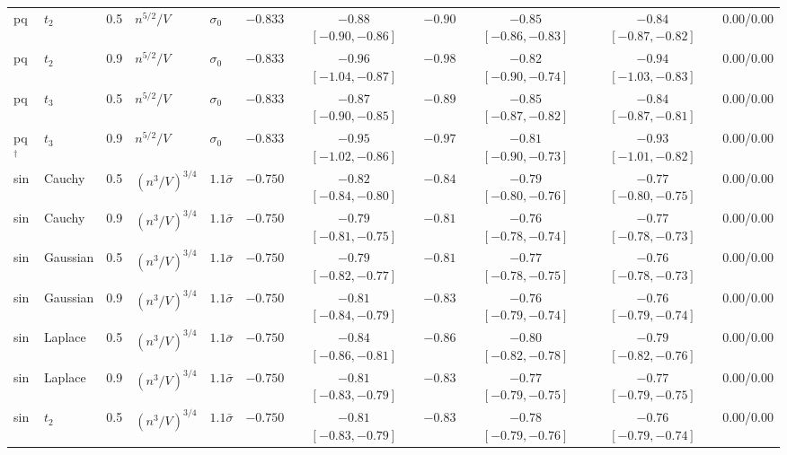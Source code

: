 \begin{longtable}{lllllcccccc}
pq & $t_2$ & 0.5 & $n^{5/2}/V$ & $\sigma_0$ & $-0.833$ & $-0.88$ {\scriptsize $[-0.90, -0.86]$} & $-0.90$ & $-0.85$ {\scriptsize $[-0.86, -0.83]$} & $-0.84$ {\scriptsize $[-0.87, -0.82]$} & 0.00/0.00 \\
pq & $t_2$ & 0.9 & $n^{5/2}/V$ & $\sigma_0$ & $-0.833$ & $-0.96$ {\scriptsize $[-1.04, -0.87]$} & $-0.98$ & $-0.82$ {\scriptsize $[-0.90, -0.74]$} & $-0.94$ {\scriptsize $[-1.03, -0.83]$} & 0.00/0.00 \\
pq & $t_3$ & 0.5 & $n^{5/2}/V$ & $\sigma_0$ & $-0.833$ & $-0.87$ {\scriptsize $[-0.90, -0.85]$} & $-0.89$ & $-0.85$ {\scriptsize $[-0.87, -0.82]$} & $-0.84$ {\scriptsize $[-0.87, -0.81]$} & 0.00/0.00 \\
pq$^\dagger$ & $t_3$ & 0.9 & $n^{5/2}/V$ & $\sigma_0$ & $-0.833$ & $-0.95$ {\scriptsize $[-1.02, -0.86]$} & $-0.97$ & $-0.81$ {\scriptsize $[-0.90, -0.73]$} & $-0.93$ {\scriptsize $[-1.01, -0.82]$} & 0.00/0.00 \\
sin & Cauchy & 0.5 & $(n^3/V)^{3/4}$ & $1.1\bar\sigma$ & $-0.750$ & $-0.82$ {\scriptsize $[-0.84, -0.80]$} & $-0.84$ & $-0.79$ {\scriptsize $[-0.80, -0.76]$} & $-0.77$ {\scriptsize $[-0.80, -0.75]$} & 0.00/0.00 \\
sin & Cauchy & 0.9 & $(n^3/V)^{3/4}$ & $1.1\bar\sigma$ & $-0.750$ & $-0.79$ {\scriptsize $[-0.81, -0.75]$} & $-0.81$ & $-0.76$ {\scriptsize $[-0.78, -0.74]$} & $-0.77$ {\scriptsize $[-0.78, -0.73]$} & 0.00/0.00 \\
sin & Gaussian & 0.5 & $(n^3/V)^{3/4}$ & $1.1\bar\sigma$ & $-0.750$ & $-0.79$ {\scriptsize $[-0.82, -0.77]$} & $-0.81$ & $-0.77$ {\scriptsize $[-0.78, -0.75]$} & $-0.76$ {\scriptsize $[-0.78, -0.73]$} & 0.00/0.00 \\
sin & Gaussian & 0.9 & $(n^3/V)^{3/4}$ & $1.1\bar\sigma$ & $-0.750$ & $-0.81$ {\scriptsize $[-0.84, -0.79]$} & $-0.83$ & $-0.76$ {\scriptsize $[-0.79, -0.74]$} & $-0.76$ {\scriptsize $[-0.79, -0.74]$} & 0.00/0.00 \\
sin & Laplace & 0.5 & $(n^3/V)^{3/4}$ & $1.1\bar\sigma$ & $-0.750$ & $-0.84$ {\scriptsize $[-0.86, -0.81]$} & $-0.86$ & $-0.80$ {\scriptsize $[-0.82, -0.78]$} & $-0.79$ {\scriptsize $[-0.82, -0.76]$} & 0.00/0.00 \\
sin & Laplace & 0.9 & $(n^3/V)^{3/4}$ & $1.1\bar\sigma$ & $-0.750$ & $-0.81$ {\scriptsize $[-0.83, -0.79]$} & $-0.83$ & $-0.77$ {\scriptsize $[-0.79, -0.75]$} & $-0.77$ {\scriptsize $[-0.79, -0.75]$} & 0.00/0.00 \\
sin & $t_2$ & 0.5 & $(n^3/V)^{3/4}$ & $1.1\bar\sigma$ & $-0.750$ & $-0.81$ {\scriptsize $[-0.83, -0.79]$} & $-0.83$ & $-0.78$ {\scriptsize $[-0.79, -0.76]$} & $-0.76$ {\scriptsize $[-0.79, -0.74]$} & 0.00/0.00 \\

\end{longtable}
